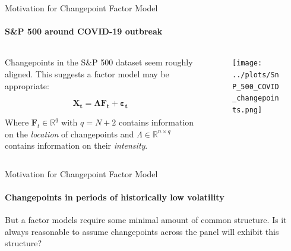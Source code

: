 \documentclass{beamer}
\begin{document}
\begin{frame}{Motivation for Changepoint Factor Model}
\framesubtitle{S\&P 500 around COVID-19 outbreak}


\begin{columns}

    \begin{column}{0.5\textwidth}
	
	Changepoints in the S\&P 500 dataset seem roughly aligned. This suggests a factor model may be appropriate:
	
	\begin{equation*}
		\boldsymbol{X_t = \Lambda F_t + \varepsilon_t}
	\end{equation*}		
	
	\bigskip	
	
	Where $\boldsymbol{F}_t \in \mathbb{R}^{q}$ with $q=N+2$ contains information on the \textit{location} of changepoints and $\Lambda \in \mathbb{R}^{n \times q}$ contains information on their \textit{intensity}.
	
    \end{column}
    
    \begin{column}{0.5\textwidth}
		\begin{figure}
    			\centering
    			\texttt{[image: ../plots/SnP\_500\_COVID\_changepoints.png]}
		\end{figure}
    \end{column}
    
\end{columns}

\end{frame}




\begin{frame}{Motivation for Changepoint Factor Model}
\framesubtitle{Changepoints in periods of historically low volatility}

But a factor models require some minimal amount of common structure. Is it always reasonable to assume changepoints across the panel will exhibit this structure? 

\begin{figure}
    \centering
    \begin{subfigure}
        \texttt{[image: ../plots/SnP500\_LR\_COVID.png]}
    \end{subfigure}
    \begin{subfigure}
        \texttt{[image: ../plots/SnP500\_LR\_lowvol.png]}
    \end{subfigure}
\end{figure}

\end{frame}
\end{document}
